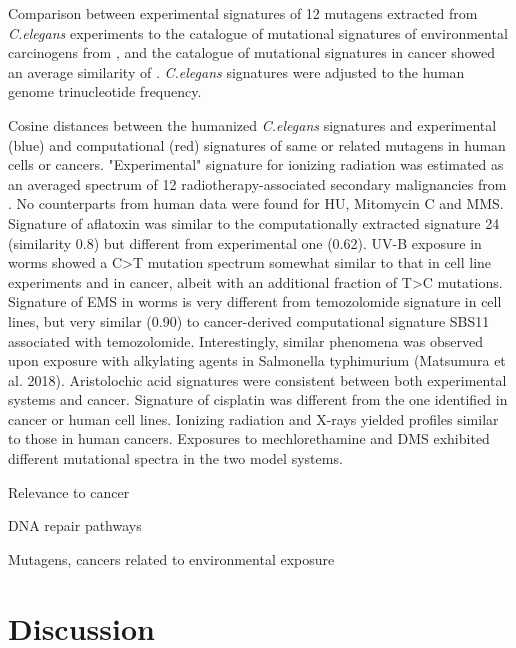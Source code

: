 Comparison between experimental signatures of 12 mutagens extracted from \textit{C.elegans} 
experiments to the catalogue of mutational signatures of environmental carcinogens from \cite{Kucab2019-ti}, 
and the catalogue of mutational signatures in cancer \cite{Alexandrov2018-ya} showed an average similarity of 
. \textit{C.elegans} signatures were adjusted to the human genome trinucleotide frequency.

Cosine distances between the humanized \textit{C.elegans} signatures and experimental (blue) 
and computational (red) signatures of same or related mutagens in human cells or cancers. 
"Experimental" signature for ionizing radiation was estimated as an averaged spectrum of 
12 radiotherapy-associated secondary malignancies from \cite{Behjati}. No counterparts 
from human data were found for HU, Mitomycin C and MMS. Signature of aflatoxin was similar 
to the computationally extracted signature 24 (similarity 0.8) but different from 
experimental one (0.62). UV-B exposure in worms showed a C>T mutation spectrum somewhat 
similar to that in cell line experiments and in cancer, albeit with an additional fraction
of T>C mutations. Signature of EMS in worms is very different from temozolomide signature 
in cell lines, but very similar (0.90) to cancer-derived computational signature SBS11 
associated with temozolomide. Interestingly, similar phenomena was observed upon exposure 
with alkylating agents in Salmonella typhimurium (Matsumura et al. 2018). Aristolochic 
acid signatures were consistent between both experimental systems and cancer. Signature 
of cisplatin was different from the one identified in cancer or human cell lines. 
Ionizing radiation and X-rays yielded profiles similar to those in human cancers. 
Exposures to mechlorethamine and DMS exhibited different mutational spectra in 
the two model systems.



Relevance to cancer

DNA repair pathways

Mutagens, cancers related to environmental exposure


\section{Discussion}

